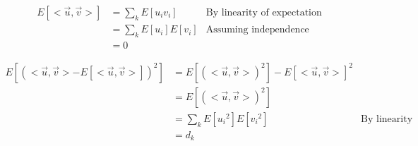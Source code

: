 \documentclass{article}
\begin{document}
\begin{align*}
    E[<\vec{u},\vec{v}>] & =  \sum_k E[u_i v_i] &\text{By linearity of expectation} \\
    & =\sum_k E[u_i]E[v_i] & \text{Assuming independence} \\
    & = 0
\end{align*}

\begin{align*}
    E[(<\vec{u},\vec{v}>-E[<\vec{u},\vec{v}>])^2]  & = E[(<\vec{u},\vec{v}>)^2] - E[<\vec{u},\vec{v}>]^2 \\
    & = E[(<\vec{u},\vec{v}>)^2] \\
    & =  \sum_k E[{u_i}^2] E[{v_i}^2] &\text{By linearity of expectation and indepedence} \\
    & = d_k
\end{align*}

\fi
\end{document}
